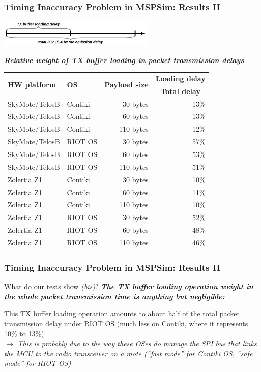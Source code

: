 \documentclass[10pt,c]{beamer}
\renewcommand{\emph}[1]{\textbf{\textit{#1}}}
\newcommand{\tblcaption}[1]{\textbf{\textsl{\small#1}}\vspace{0.1cm}}
\begin{document}
\begin{frame}
\frametitle{Timing Inaccuracy Problem in MSPSim: Results II}
\begin{center}
\vspace{-0.4cm}
\includegraphics[width=7.5cm]{Delays.png}
\vspace{0.1cm}

\tblcaption{\small Relative weight of TX buffer loading
            in packet transmission delays}
\small
\begin{tabular}{|l|l|r|r|}
\hline
\multirow{2}{2.5cm}{\textbf{HW platform}}
 & \multirow{2}{1cm}{\textbf{OS}}
  & \multirow{2}{2cm}{\textbf{Payload size}}
     & \multicolumn{1}{|c|}{\textbf{\underline{Loading delay}}} \\
 & & & \multicolumn{1}{|c|}{\textbf{Total delay}} \\
\hline
SkyMote/TelosB & Contiki &  30 bytes & 13\% \\
SkyMote/TelosB & Contiki &  60 bytes & 13\% \\
SkyMote/TelosB & Contiki & 110 bytes & 12\% \\
\hline
SkyMote/TelosB & RIOT OS &  30 bytes & 57\% \\
SkyMote/TelosB & RIOT OS &  60 bytes & 53\% \\
SkyMote/TelosB & RIOT OS & 110 bytes & 51\% \\
\hline
Zolertia Z1    & Contiki &  30 bytes & 10\% \\
Zolertia Z1    & Contiki &  60 bytes & 11\% \\
Zolertia Z1    & Contiki & 110 bytes & 10\% \\
\hline
Zolertia Z1    & RIOT OS &  30 bytes & 52\% \\
Zolertia Z1    & RIOT OS &  60 bytes & 48\% \\
Zolertia Z1    & RIOT OS & 110 bytes & 46\% \\
\hline
\end{tabular}
\end{center}
\end{frame}

\begin{frame}
\frametitle{Timing Inaccuracy Problem in MSPSim: Results II}
\begin{block}{What do our tests show \textit{(bis)}?}
\emph{The TX buffer loading operation weight in the whole packet
transmission time is anything but negligible:}

This TX buffer loading operation amounts to about half of the total
packet transmission delay under RIOT OS (much less on Contiki,
where it represents 10\% to 13\%) \\
$\rightarrow$ \textit{This is probably due to the way these OSes do manage
the SPI bus that links the MCU to the radio transceiver on a mote
(``fast mode'' for Contiki OS, ``safe mode'' for RIOT OS)}
\end{block}
\end{frame}
\end{document}
